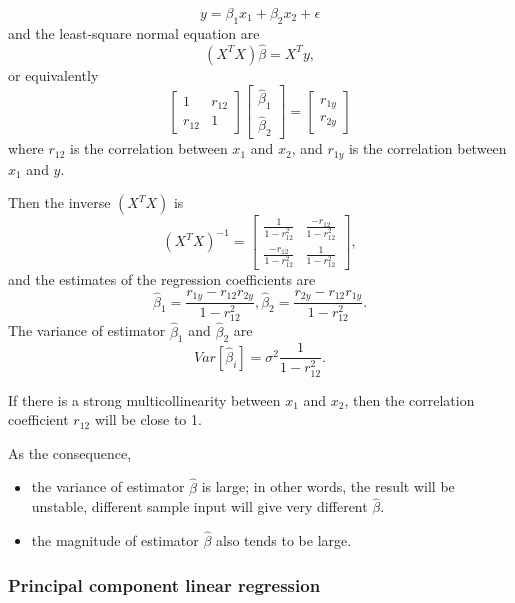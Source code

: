 \begin{refsection}
\begin{remark}[interpretation]
\end{remark}



\begin{example}\cite[326]{montgomery2012introduction}
$$y = \beta_1 x_1 + \beta_2 x_2 + \epsilon$$
and the least-square normal equation are
$$(X^TX)\hat{\beta} = X^Ty,$$
or equivalently
$$\begin{bmatrix}
1 & r_{12} \\
r_{12} & 1
\end{bmatrix}\begin{bmatrix}
\hat{\beta}_1\\
\hat{\beta}_2
\end{bmatrix} = \begin{bmatrix}
r_{1y}\\
r_{2y}
\end{bmatrix}$$
where $r_{12}$ is the correlation between $x_1$ and $x_2$, and $r_{1y}$ is the correlation between $x_1$ and $y$. 

Then the inverse $(X^TX)$ is
$$(X^TX)^{-1}=\begin{bmatrix}
\frac{1}{1-r_{12}^2} & \frac{-r_{12}}{1-r_{12}^2}  \\
\frac{-r_{12}}{1-r_{12}^2} & \frac{1}{1-r_{12}^2}  
\end{bmatrix},$$
and the estimates of the regression coefficients are
$$\hat{\beta}_1 = \frac{r_{1y} - r_{12}r_{2y}}{1 - r_{12}^2},\hat{\beta}_2 = \frac{r_{2y} - r_{12}r_{1y}}{1 - r_{12}^2}.$$
The variance of estimator $\hat{\beta}_1$ and $\hat{\beta}_2$ are
$$Var[\hat{\beta}_i] = \sigma^2\frac{1}{1-r_{12}^2}.$$

If there is a strong multicollinearity between $x_1$ and $x_2$, then the correlation coefficient $r_12$ will be close to 1.	

As the consequence, 
\begin{itemize}
	\item the variance of estimator $\hat{\beta}$ is large; in other words, the result will be unstable, different sample input will give very different $\hat{\beta}$.
	\item the magnitude of estimator $\hat{\beta}$ also tends to be large. 
\end{itemize}
\end{example}

\subsubsection{Principal component linear regression}



\end{refsection}
